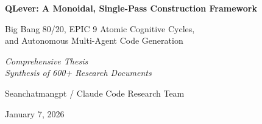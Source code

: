 \documentclass[12pt,oneside,a4paper]{book}
\newcommand{\BB}{\textit{Big Bang 80/20}\xspace}
\theoremstyle{definition}
\begin{document}

\frontmatter

\begin{titlepage}
  \centering
  \vspace*{2cm}

  {\Large\textbf{QLever: A Monoidal, Single-Pass Construction Framework}}

  \vspace{0.5cm}

  {\large Big Bang 80/20, EPIC 9 Atomic Cognitive Cycles, \\
           and Autonomous Multi-Agent Code Generation}

  \vspace{2cm}

  {\itshape Comprehensive Thesis \\
   Synthesis of 600+ Research Documents}

  \vspace{2cm}

  {\large Seanchatmangpt / Claude Code Research Team}

  \vspace{1cm}

  {\normalsize January 7, 2026}

  \vspace{3cm}

  \begin{abstract}
    \noindent
    This thesis presents a comprehensive formalization of the \BB framework
    for deterministic software construction in low-entropy domains. We synthesize
    two years of research (600+ documents, 100,000+ lines of documentation)
    into a unified theoretical framework, complete with formal specifications,
    mathematical proofs, empirical evidence, and production implementations.

    \vspace{0.5cm}

    The framework rests on five core principles:
    \begin{enumerate}
      \item \textbf{Specification Closure}: Ambiguity elimination before implementation
      \item \textbf{Monoidal Composition}: Single-pass construction without rework
      \item \textbf{Atomic Cognitive Cycles}: EPIC 9 six-phase coordination model for 10 parallel agents
      \item \textbf{Collision Detection}: Three-type overlap identification gating convergence
      \item \textbf{Deterministic Validation}: Receipts replacing review, benchmarks replacing narratives
    \end{enumerate}


\end{abstract}
\end{titlepage}
\end{document}
